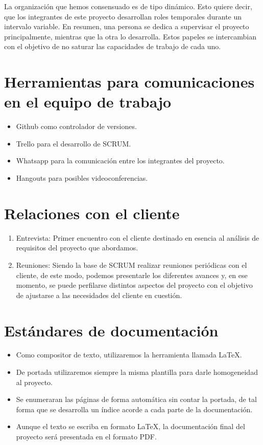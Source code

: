 \documentclass[a4paper,12pt,oneside]{article}
\begin{document}
La organización que hemos consensuado es de tipo dinámico. Esto quiere decir, que los integrantes de este proyecto desarrollan roles temporales durante un intervalo variable. En resumen, una persona se dedica a supervisar el proyecto principalmente, mientras que la otra lo desarrolla. Estos papeles se intercambian con el objetivo de no saturar las capacidades de trabajo de cada uno.

\section{Herramientas para comunicaciones en el equipo de trabajo}

\begin{itemize}
	\item Github como controlador de versiones.
	\item Trello para el desarrollo de SCRUM.
	\item Whatsapp para la comunicación entre los integrantes del proyecto.
	\item Hangouts para posibles videoconferencias.
\end{itemize}

\section{Relaciones con el cliente}

\begin{enumerate}
	\item Entrevista: Primer encuentro con el cliente destinado en esencia al análisis de requisitos del proyecto que abordamos. 
	\item Reuniones: Siendo la base de SCRUM realizar reuniones periódicas con el cliente, de este modo, podemos presentarle los diferentes avances y, en ese momento, se puede perfilarse distintos aspectos del proyecto con el objetivo de ajustarse a las necesidades del cliente en cuestión.
\end{enumerate}

\section{Estándares de documentación}

\begin{itemize}
	\item Como compositor de texto, utilizaremos la herramienta llamada \LaTeX.
	\item De portada utilizaremos siempre la misma plantilla para darle homogeneidad al proyecto.
	\item Se enumeraran las páginas de forma automática sin contar la portada, de tal forma que se desarrolla un índice acorde a cada parte de la documentación.
	\item Aunque el texto se escriba en formato \LaTeX, la documentación final del proyecto será presentada en el formato PDF.
\end{itemize}
\end{document}
